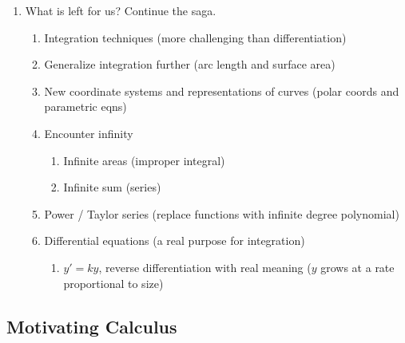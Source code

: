 \documentclass{article}
\newcommand{\ds}{\displaystyle}
\begin{document}
\begin{enumerate}
\item What is left for us? Continue the saga.
\begin{enumerate}
\item Integration techniques (more challenging than differentiation)
\item Generalize integration further (arc length and surface area)
\item New coordinate systems and representations of curves (polar coords and parametric eqns)
\item Encounter infinity 
\begin{enumerate}
\item Infinite areas (improper integral)
\item Infinite sum (series)
\end{enumerate}
\item Power / Taylor series (replace functions with infinite degree polynomial)
\item Differential equations (a real purpose for integration)
\begin{enumerate}
\item $\ds y' = ky$, reverse differentiation with real meaning ($y$ grows at a rate proportional to size)
\end{enumerate}
\end{enumerate}

\end{enumerate}

\subsection{Motivating Calculus}
\end{document}
